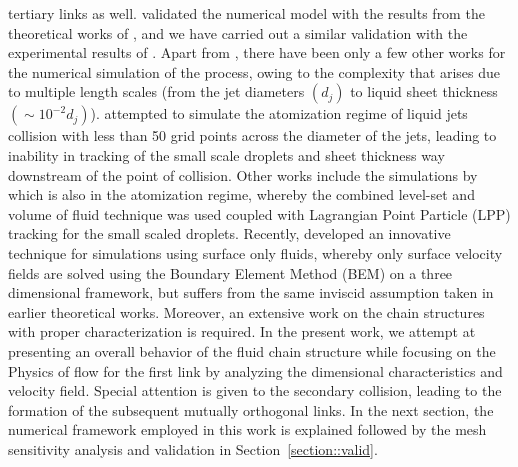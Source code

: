 \documentclass[%
aip,
sd,%
amsmath,amssymb,
preprint,%
author-year,%
]{revtex4-1}
\begin{document}
tertiary links as well. \cite{chen2013high} validated the numerical model with the results from the theoretical works of \cite{bremond2006atomization}, and we have carried out a similar validation with the experimental results of \cite{bush2004collision}. Apart from \cite{chen2013high}, there have been only a few other works for the numerical simulation of the process, owing to the complexity that arises due to multiple length scales (from the jet diameters $\left(d_j\right)$ to liquid sheet thickness $\left(\sim 10^{-2}d_j\right)$). \cite{inoue2008study,inoue2009liquid} attempted to simulate the atomization regime of liquid jets collision with less than 50 grid points across the diameter of the jets, leading to inability in tracking of the small scale droplets and sheet thickness way downstream of the point of collision. Other works include the simulations by \cite{arienti2012coupled} which is also in the atomization regime, whereby the combined level-set and volume of fluid technique \citep{sussman2007sharp} was used coupled with Lagrangian Point Particle (LPP) tracking for the small scaled droplets. Recently, \cite{da2016surface} developed an innovative technique for simulations using surface only fluids, whereby only surface velocity fields are solved using the Boundary Element Method (BEM) on a three dimensional framework, but suffers from the same inviscid assumption taken in earlier theoretical works. Moreover, an extensive work on the chain structures with proper characterization is required. In the present work, we attempt at presenting an overall behavior of the fluid chain structure while focusing on the Physics of flow for the first link by analyzing the dimensional characteristics and velocity field. Special attention is given to the secondary collision, leading to the formation of the subsequent mutually orthogonal links. In the next section, the numerical framework employed in this work is explained followed by the mesh sensitivity analysis and validation in Section~\ref{section::valid}. 
\end{document}

